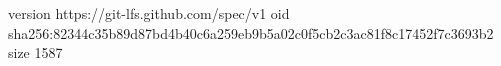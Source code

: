 version https://git-lfs.github.com/spec/v1
oid sha256:82344c35b89d87bd4b40c6a259eb9b5a02c0f5cb2c3ac81f8c17452f7c3693b2
size 1587
